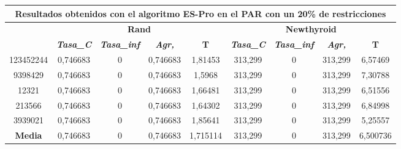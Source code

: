 \documentclass[12pt, spanish]{article}
\begin{document}
\begin{table}[H]
\begin{tabular}{|c|c|c|c|c|c|c|c|c|}
\hline
\multicolumn{9}{|c|}{\textbf{Resultados obtenidos con el algoritmo ES-Pro en el PAR con un 20\% de restricciones}}                                                                                                \\ \hline
\multirow{2}{*}{} & \multicolumn{4}{c|}{\textbf{Rand}}                                                            & \multicolumn{4}{c|}{\textbf{Newthyroid}}                                                      \\ \cline{2-9} 
                  & \textit{\textbf{Tasa\_C}} & \textit{\textbf{Tasa\_inf}} & \textit{\textbf{Agr,}} & \textbf{T} & \textit{\textbf{Tasa\_C}} & \textit{\textbf{Tasa\_inf}} & \textit{\textbf{Agr,}} & \textbf{T} \\ \hline
123452244         & 0,746683                  & 0                           & 0,746683               & 1,81453    & 313,299                   & 0                           & 313,299                & 6,57469    \\ \hline
9398429           & 0,746683                  & 0                           & 0,746683               & 1,5968     & 313,299                   & 0                           & 313,299                & 7,30788    \\ \hline
12321             & 0,746683                  & 0                           & 0,746683               & 1,66481    & 313,299                   & 0                           & 313,299                & 6,51556    \\ \hline
213566            & 0,746683                  & 0                           & 0,746683               & 1,64302    & 313,299                   & 0                           & 313,299                & 6,84998    \\ \hline
3939021           & 0,746683                  & 0                           & 0,746683               & 1,85641    & 313,299                   & 0                           & 313,299                & 5,25557    \\ \hline
\textbf{Media}    & 0,746683                  & 0                           & 0,746683               & 1,715114   & 313,299                   & 0                           & 313,299                & 6,500736   \\ \hline
\end{tabular}
\end{table}
\end{document}
